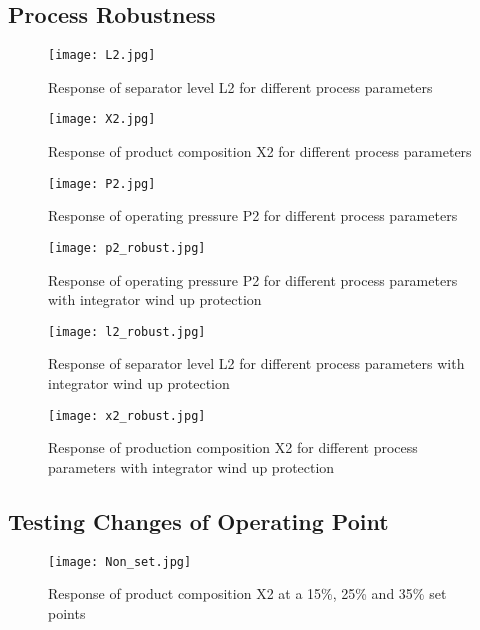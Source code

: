 \documentclass[11pt]{article}
\begin{document}
\subsection{Process Robustness}

\begin{figure}[H]
    \centering
    \texttt{[image: L2.jpg]}
    \caption{Response of separator level L2 for different process parameters}
    \label{fig:L2}
\end{figure}

\begin{figure}[H]
    \centering
    \texttt{[image: X2.jpg]}
    \caption{Response of product composition X2 for different process parameters}
    \label{fig:X2}
\end{figure}

\begin{figure}[H]
    \centering
    \texttt{[image: P2.jpg]}
    \caption{Response of operating pressure P2 for different process parameters}
    \label{fig:P2}
\end{figure}

\begin{figure}[H]
    \centering
    \texttt{[image: p2\_robust.jpg]}
    \caption{Response of operating pressure P2 for different process parameters with integrator wind up protection}
    \label{fig:p2_robust}
\end{figure}

\begin{figure}[H]
    \centering
    \texttt{[image: l2\_robust.jpg]}
    \caption{Response of separator level L2 for different process parameters with integrator wind up protection}
    \label{fig:l2_robust}
\end{figure}

\begin{figure}[H]
    \centering
    \texttt{[image: x2\_robust.jpg]}
    \caption{Response of production composition X2 for different process parameters with integrator wind up protection}
    \label{fig:x2_robust}
\end{figure}

\subsection{Testing Changes of Operating Point}

\begin{figure}[H]
    \centering
    \texttt{[image: Non\_set.jpg]}
    \caption{Response of product composition X2 at a 15\%, 25\% and 35\% set points}
    \label{fig:Non_set}
\end{figure}
\end{document}

